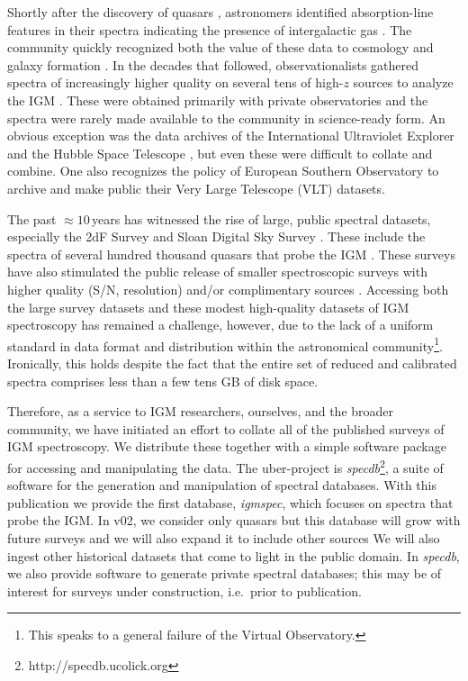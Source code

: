 \documentclass[12pt]{elsarticle}
\begin{document}
Shortly after the discovery of quasars \cite{schmidt63},
astronomers identified absorption-line features in their 
spectra indicating the presence of intergalactic gas
\citep{bs65,blb66}.  
The community quickly recognized both the value of these
data to cosmology and galaxy formation \citep{gp65,bs69}.
In the decades that followed, observationalists gathered
spectra of increasingly higher quality on several tens of
high-$z$ sources to analyze the IGM 
\citep{sargent80,tytler82,wolfe86,lzt91}.
These were obtained primarily with private observatories and
the spectra were rarely made available
to the community in science-ready form.
An obvious exception was the data archives of the
International Ultraviolet Explorer
and the Hubble Space Telescope 
\citep[{\it HST};][]{hstkeyproj_1,bechtold02},
but even these were difficult to 
collate and combine.
One also recognizes the policy of European Southern
Observatory to archive and
make public their Very Large Telescope (VLT) datasets.

The past $\approx 10$\,years has witnessed the
rise of large, public spectral datasets, especially
the 2dF Survey and Sloan Digital Sky Survey \citep[SDSS;][]{yaa+00,croom01}.
These include the spectra of several hundred thousand quasars
that probe the IGM \citep[e.g.][]{sdss_qso_dr7}.
These surveys have also stimulated the public release
of smaller spectroscopic surveys with higher quality
(S/N, resolution) and/or complimentary sources
\citep[e.g.][]{pwh+07,prochaska+15}.
Accessing both the large survey datasets 
and these modest high-quality datasets of IGM spectroscopy
has remained a challenge, however, due to the lack of a
uniform standard in data format and distribution within the astronomical
community\footnote{This speaks to a general failure of the
Virtual Observatory.}.
Ironically, this holds despite the fact that the entire set of
reduced and calibrated spectra 
comprises less than a few tens GB of disk space.

Therefore, as a service to IGM researchers, ourselves, and the
broader community, we have initiated an effort to collate 
all of the published surveys of IGM spectroscopy. We distribute
these together with a simple software package
for accessing and manipulating the data.  
The uber-project is {\it specdb}\footnote{http://specdb.ucolick.org},
a suite of software
for the generation and manipulation of spectral databases.
With this publication we provide the first database,
{\it igmspec}, which focuses on spectra that probe the IGM. 
In v02, we consider only quasars but 
this database will grow with future surveys 
and we will also expand it to include other sources
\citep[e.g. gamma-ray burst afterglow spectra, star-forming
galaxies, supernovae;][]{fjp+09,rpk+10,cooke+12}
We will also ingest other historical 
datasets that come to light in
the public domain.  
In {\it specdb}, we also provide 
software to generate private spectral databases; 
this may be of interest for surveys 
under construction, i.e.\ prior to publication.
\end{document}

